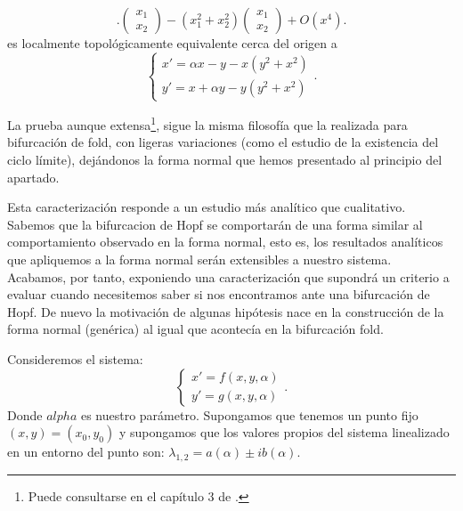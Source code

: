 \begin{enumerate}
\begin{lemma}
\begin{equation}
		.
		\begin{pmatrix}
		x_1 \\
		x_2
		\end{pmatrix}
		-(x_1^2+x_2^2)
		\begin{pmatrix}
		x_1 \\
		x_2
		\end{pmatrix}
		+O(x^4).
		\end{equation}
		es localmente topológicamente equivalente cerca del origen a \[ \left \{ \begin{matrix} x'=\alpha x-y-x(y^2+x^2)\\ y'=x+\alpha y-y(y^2+x^2)\end{matrix}\right . .\]
	\end{lemma}
	
	La prueba aunque extensa\footnote{Puede consultarse en el capítulo 3 de \cite{Kuznet}.}, sigue la misma filosofía que la realizada para bifurcación de fold, con ligeras variaciones (como el estudio de la existencia del ciclo límite), dejándonos la forma normal que hemos presentado al principio del apartado.
	
	Esta caracterización responde a un estudio más analítico que cualitativo. Sabemos que la bifurcacion de Hopf se comportarán de una forma similar al comportamiento observado en la forma normal, esto es, los resultados analíticos que apliquemos a la forma normal serán extensibles a nuestro sistema. \\
	
	
	Acabamos, por tanto, exponiendo una caracterización que supondrá un criterio a evaluar cuando necesitemos saber si nos encontramos ante una bifurcación de Hopf. 
	De nuevo la motivación de algunas hipótesis nace en la construcción de la forma normal (genérica) al igual que acontecía en la bifurcación fold.
	
	\begin{theorem}
		Consideremos el sistema:
		\[ \left \{ \begin{matrix} x'=f(x,y,\alpha)\\ y'=g(x,y,\alpha)\end{matrix}\right . .\]
		Donde $alpha$ es nuestro parámetro. Supongamos que tenemos un punto fijo $(x,y)=(x_0,y_0)$ y supongamos que los valores propios del sistema linealizado en un entorno del punto son: $\lambda_{1,2}=a(\alpha)\pm ib(\alpha)$.
		

\end{theorem}
\end{enumerate}
